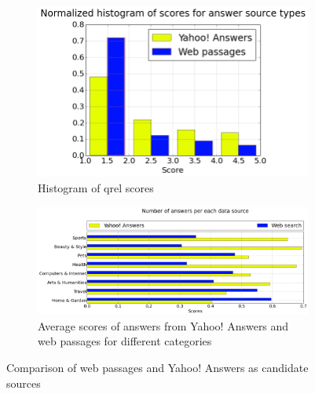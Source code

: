 \begin{figure}
	\centering
	\begin{subfigure}[b]{0.38\textwidth}
		\includegraphics[width=\textwidth]{img/liveqa_answer_source_scores}
		\caption{Histogram of qrel scores}
		\label{figure:non-factoid:liveqa:answer_source:scores}
	\end{subfigure}
	\begin{subfigure}[b]{0.6\textwidth}
		\includegraphics[width=\textwidth]{img/liveqa_answer_source_by_category}
		\caption{Average scores of answers from Yahoo! Answers and web passages for different categories}
		\label{figure:non-factoid:liveqa:answer_source:category}
	\end{subfigure}
	\caption{Comparison of web passages and Yahoo! Answers as candidate sources}
	\label{figure:non-factoid:liveqa:answer_source}
\end{figure}


